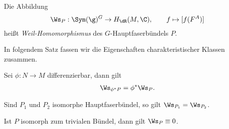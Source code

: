 \documentclass[%
	paper=a5,%
	fleqn,%
	DIV=18,%
	BCOR=0mm,
	fontsize=11pt,
	titlepage=false,%
	bibliography=totoc,
	DIV=18,%
	twoside=true,
	pdftitle=Riemannsche Geometrie,
	pdfauthor=Uwe Semmelmann,
	numbers=noendperiod]%
	{scrbook}
\begin{document}
\begin{defn}
Die Abbildung
\begin{align*}
\Ws_P : \Sym(\g)^G \to H_{\dR}(M,\C),\qquad f \mapsto [f(F^A)]
\end{align*}
heißt \emph{Weil-Homomorphismus} des $G$-Hauptfaserbündels $P$.\fish
\end{defn}

In folgendem Satz fassen wir die Eigenschaften charakteristischer Klassen
zusammen.

\begin{prop}
\begin{propenum}
\item Sei $\phi\colon N\to M$ differenzierbar, dann gilt
\begin{align*}
\Ws_{\phi^* P} = \phi^*\Ws_P.
\end{align*}
\item Sind $P_1$ und $P_2$ isomorphe Hauptfaserbündel, so gilt $\Ws_{P_1} =
\Ws_{P_2}$.
\item Ist $P$ isomorph zum trivialen Bündel, dann gilt $\Ws_P\equiv 0$.\fish
\end{propenum}


\end{prop}
\end{document}

